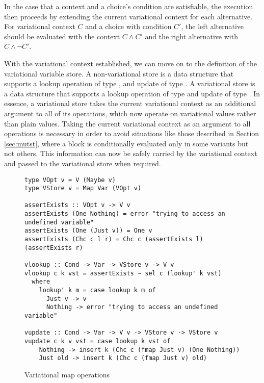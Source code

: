 \documentclass[12pt,oneside]{book}
\begin{document}
In the case that a context and a choice's condition are satisfiable, the execution then proceeds by extending the current variational context for each alternative.
For variational context $C$ and a choice with condition $C'$, the left alternative should be evaluated with the context $C \wedge C'$ and the right alternative with
$C \wedge \neg C'$.

With the variational context established, we can move on to the definition of the variational variable store. A non-variational store is a data structure
that supports a lookup operation of type , and update of type .
A variational store is a data structure that supports a lookup operation of type  and update of type
. In essence, a variational store takes the current variational context as an
additional argument to all of its operations, which now operate on variational values rather than plain values. Taking the current variational context as an argument to all
operations is necessary in order to avoid situations like those described in Section \ref{sec:mutst}, where a block is conditionally
evaluated only in some variants but not others. This information can now be safely carried by the variational context and passed
to the variational store when required.

\begin{figure}
\begin{lstlisting}
type VOpt v = V (Maybe v)
type VStore v = Map Var (VOpt v)

assertExists :: VOpt v -> V v
assertExists (One Nothing) = error "trying to access an undefined variable"
assertExists (One (Just v)) = One v
assertExists (Chc c l r) = Chc c (assertExists l) (assertExists r)

vlookup :: Cond -> Var -> VStore v -> V v
vlookup c k vst = assertExists ~ sel c (lookup' k vst)
  where
    lookup' k m = case lookup k m of
      Just v -> v
      Nothing -> error "trying to access an undefined variable"

vupdate :: Cond -> Var -> V v -> VStore v -> VStore v
vupdate c k v vst = case lookup k vst of
    Nothing -> insert k (Chc c (fmap Just v) (One Nothing))
    Just old -> insert k (Chc c (fmap Just v) old)
\end{lstlisting}
\caption{Variational map operations}
\label{fig:varmap}
\end{figure}
\end{document}
